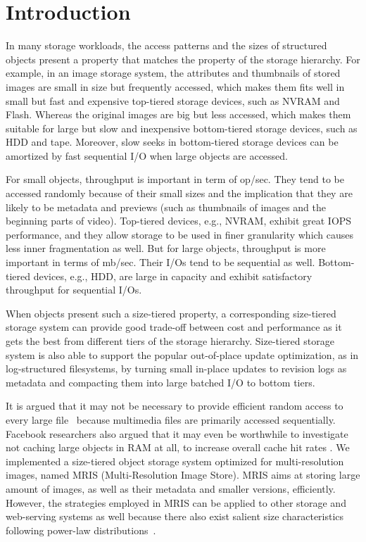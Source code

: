 \section{Introduction}
\label{intro}

In many storage workloads, the access patterns and the sizes of
structured objects present a property that matches the property of the
storage hierarchy. For example, in an image storage system, the
attributes and thumbnails of stored images are small in size but
frequently accessed, which makes them fits well in small but fast and
expensive top-tiered storage devices, such as NVRAM and Flash.
Whereas the original images are big but less accessed, which makes
them suitable for large but slow and inexpensive bottom-tiered storage
devices, such as HDD and tape.  Moreover, slow seeks in bottom-tiered
storage devices can be amortized by fast sequential I/O when large
objects are accessed.

For small objects, throughput is important in term of op/sec. They
tend to be accessed randomly because of their small sizes and the
implication that they are likely to be metadata and previews (such as
thumbnails of images and the beginning parts of video).
Top-tiered devices, e.g., NVRAM, exhibit great IOPS performance, and
they allow storage to be used in finer granularity which causes less
inner fragmentation as well. But for large objects, throughput is more
important in terms of mb/sec. Their I/Os tend to be sequential as
well. Bottom-tiered devices, e.g., HDD, are large in capacity and
exhibit satisfactory throughput for sequential I/Os. 


When objects present such a size-tiered property, a corresponding
size-tiered storage system can provide good trade-off between cost and
performance as it gets the best from different tiers of the storage
hierarchy. Size-tiered storage system is also able to support the
popular out-of-place update optimization, as in log-structured
filesystems, by turning small in-place updates to revision logs as
metadata and compacting them into large batched I/O to bottom tiers.

It is argued that it may not be necessary to provide efficient random
access to every large file~\cite{evans2002study} because multimedia
files are primarily accessed sequentially. Facebook researchers also
argued that it may even be worthwhile to investigate not caching large
objects in RAM at all, to increase overall cache hit rates
\cite{kvworkload_sigmetrics}.  We implemented a size-tiered object
storage system optimized for multi-resolution images, named MRIS
(Multi-Resolution Image Store).  MRIS aims at storing large amount of
images, as well as their metadata and smaller versions, efficiently.
However, the strategies employed in MRIS can be applied to other
storage and web-serving systems as well because there also exist
salient size characteristics following power-law
distributions~\cite{kvworkload_sigmetrics}.

